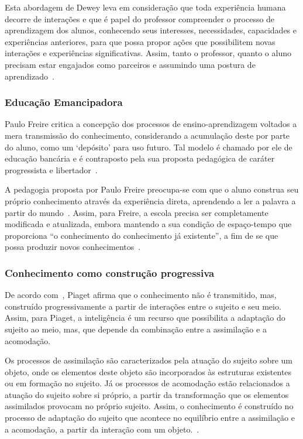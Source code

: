 Esta abordagem de Dewey leva em consideração que toda experiência humana decorre de interações e que é papel do professor compreender o processo de aprendizagem dos alunos, conhecendo seus interesses, necessidades, capacidades e experiências anteriores, para que possa propor ações que possibilitem novas interações e experiências significativas. Assim, tanto o professor, quanto o aluno precisam estar engajados como parceiros e assumindo uma postura de aprendizado~\citep{Almeida:2000}.

\subsubsection{Educação Emancipadora}

Paulo Freire critica a concepção dos processos de ensino-aprendizagem voltados a mera transmissão do conhecimento, considerando a acumulação deste por parte do aluno, como um `depósito' para uso futuro. Tal modelo é chamado por ele de educação bancária e é contraposto pela sua proposta pedagógica de caráter progressista e libertador~\citep{Freire:1987, Almeida:2000}.

A pedagogia proposta por Paulo Freire preocupa-se com que o aluno construa seu próprio conhecimento através da experiência direta, aprendendo a ler a palavra a partir do mundo~\citep{Almeida:2000}. Assim, para Freire, a escola precisa ser completamente modificada e atualizada, embora mantendo a sua condição de espaço-tempo que proporciona ``o conhecimento do conhecimento já existente'', a fim de se que possa produzir novos conhecimentos~\citep{Freire:1996}.

\subsubsection{Conhecimento como construção progressiva}\label{subsub:piaget}
De acordo com~\cite{Almeida:2000}, Piaget afirma que o conhecimento não é transmitido, mas, construído progressivamente a partir de interações entre o sujeito e seu meio. Assim, para Piaget, a inteligência é um recurso que possibilita a adaptação do sujeito ao meio, mas, que depende da combinação entre a assimilação e a acomodação.

Os processos de assimilação são caracterizados pela atuação do sujeito sobre um objeto, onde os elementos deste objeto são incorporados às estruturas existentes ou em formação no sujeito. Já os processos de acomodação estão relacionados a atuação do sujeito sobre si próprio, a partir da transformação que os elementos assimilados provocam no próprio sujeito. Assim, o conhecimento é construído no processo de adaptação do sujeito que acontece no equilíbrio entre a assimilação e a acomodação, a partir da interação com um objeto.~\citep{Almeida:2000}.

